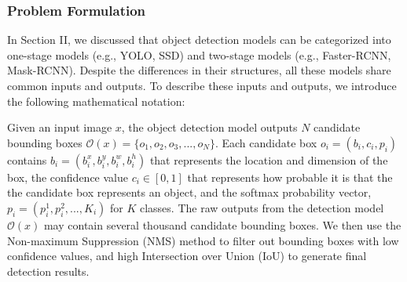\subsubsection{Problem Formulation} 


In Section II, we discussed that object detection models can be categorized into one-stage models (e.g., YOLO, SSD) and two-stage models (e.g., Faster-RCNN, Mask-RCNN). Despite the differences in their structures, all these models share common inputs and outputs. To describe these inputs and outputs, we introduce the following mathematical notation:


Given an input image $x$, the object detection model outputs $N$ candidate bounding boxes $\mathcal{O}(x) = \{o_1, o_2, o_3, ..., o_N\}$. Each candidate box $o_i=(b_i, c_i, p_i)$ contains $b_i=(b^x_i, b^y_i, b^w_i, b^h_i)$ that represents the location and dimension of the box, the confidence value $c_i \in [0, 1]$ that represents how probable it is that the the candidate box represents an object, and the softmax probability vector, $p_i=(p^1_i, p^2_i, ..., K_i)$ for $K$ classes. The raw outputs from the detection model $\mathcal{O}(x)$ may contain several thousand candidate bounding boxes. We then use the Non-maximum Suppression (NMS) method \citep{bodla2017soft} to filter out bounding boxes with low confidence values, and high Intersection over Union (IoU) to generate final detection results.

